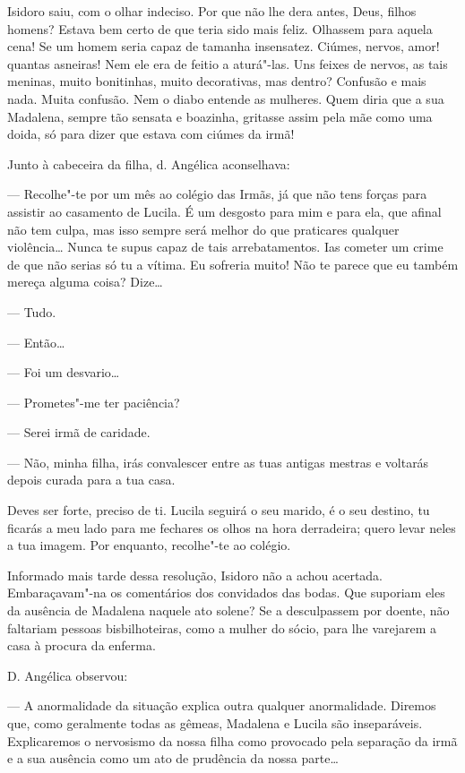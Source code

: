 Isidoro saiu, com o olhar indeciso. Por que não lhe dera antes, Deus,
filhos homens? Estava bem certo de que teria sido mais feliz. Olhassem
para aquela cena! Se um homem seria capaz de tamanha insensatez. Ciúmes,
nervos, amor! quantas asneiras! Nem ele era de feitio a aturá"-las. Uns
feixes de nervos, as tais meninas, muito bonitinhas, muito decorativas,
mas dentro? Confusão e mais nada. Muita confusão. Nem o diabo entende as
mulheres. Quem diria que a sua Madalena, sempre tão sensata e boazinha,
gritasse assim pela mãe como uma doida, só para dizer que estava com
ciúmes da irmã!

Junto à cabeceira da filha, d. Angélica aconselhava:

--- Recolhe"-te por um mês ao colégio das Irmãs, já que não tens forças
para assistir ao casamento de Lucila. É um desgosto para mim e para ela,
que afinal não tem culpa, mas isso sempre será melhor do que praticares
qualquer violência\ldots{} Nunca te supus capaz de tais arrebatamentos. Ias
cometer um crime de que não serias só tu a vítima. Eu sofreria muito!
Não te parece que eu também mereça alguma coisa? Dize\ldots{}

--- Tudo.

--- Então\ldots{}

--- Foi um desvario\ldots{}

--- Prometes"-me ter paciência?

--- Serei irmã de caridade.

--- Não, minha filha, irás convalescer entre as tuas antigas mestras e
voltarás depois curada para a tua casa.

Deves ser forte, preciso de ti. Lucila seguirá o seu marido, é o seu
destino, tu ficarás a meu lado para me fechares os olhos na hora
derradeira; quero levar neles a tua imagem. Por enquanto, recolhe"-te ao
colégio.

Informado mais tarde dessa resolução, Isidoro não a achou acertada.
Embaraçavam"-na os comentários dos convidados das bodas. Que suporiam
eles da ausência de Madalena naquele ato solene? Se a desculpassem por
doente, não faltariam pessoas bisbilhoteiras, como a mulher do sócio,
para lhe varejarem a casa à procura da enferma.

D. Angélica observou:

--- A anormalidade da situação explica outra qualquer anormalidade.
Diremos que, como geralmente todas as gêmeas, Madalena e Lucila são
inseparáveis. Explicaremos o nervosismo da nossa filha como provocado
pela separação da irmã e a sua ausência como um ato de prudência da
nossa parte\ldots{}

